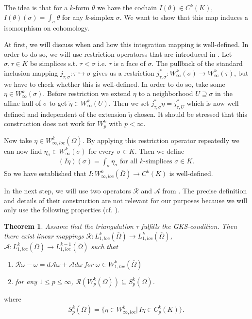 \documentclass[12pt,a4paper]{article}
\newtheorem{theorem}{Theorem}
\theoremstyle{definition}
\newcommand{\aop}{\mathscr{A}}
\newcommand{\omegabar}{\overline{\Omega}}
\newcommand{\rop}{\mathscr{R}} %
\begin{document}
The idea is that for a $k$-form $\theta$ we have the cochain 
$I(\theta) \in C^k(K)$, $I(\theta)(\sigma) = \int_\sigma \theta$ for any
$k$-simplex $\sigma$. We want to show that this map induces a isomorphism on
cohomology. 


At first, we will discuss when and how this integration mapping is well-defined. 
In order to do so, we will use restriction operatorss that are introduced in
\cite[p.191]{goldshtein}. Let $\sigma, \tau \in K$ be simplices s.t.
$\tau < \sigma$ i.e. $\tau$ is a face of $\sigma$. The pullback of the standard
inclusion mapping $j_{\tau, \sigma}: \tau \hookrightarrow \sigma$ gives us 
a restriction 
$j^*_{\tau, \sigma}: W^k_\infty(\sigma) \rightarrow W^k_\infty(\tau)$, but 
we have to check whether this is well-defined. In order to do so, take 
some $\eta \in W^k_\infty(\sigma)$. Before restriction we extend $\eta$ to 
a neighborhood $U \supseteq \sigma$ in the affine hull of $\sigma$ to 
get $\tilde{\eta} \in W^k_\infty(U)$. Then we set 
$j^*_{\tau, \sigma} \eta = j^*_{\tau, U}$ which is now well-defined and 
independent of the extension $\tilde{\eta}$ chosen. It should be stressed 
that this construction does not work for $W^k_p$ with $p < \infty$. 


Now take $\eta \in W^k_{\infty,loc}(\omegabar)$. By applying this restriction
operator repeatedly we can now find $\eta_\sigma \in W^k_\infty(\sigma)$ for 
every $\sigma \in K$. Then we define 
\begin{align*}
    (I\eta) (\sigma) = \int_\sigma \eta_\sigma 
    \text{ for all $k$-simplices } \sigma \in K .
\end{align*}
So we have established that $I: W^k_{\infty,loc}(\omegabar) \rightarrow C^k(K)$ 
is well-defined.


In the next step, we will use two operators $\rop$ and $\aop$ from 
\cite{goldshtein}.
The precise definition and details of their construction
are not relevant for our purposes because we will only use
the following properties (cf. \cite[Thm.2]{goldshtein}).

\begin{theorem}\label{operators}
    Assume that the triangulation $\tau$ fulfills the GKS-condition.
    Then there exist linear mappings 
    $\mathscr{R}: L^k_{1,loc}(\omegabar) \rightarrow 
    L^k_{1,loc}(\omegabar)$, $\mathscr{A}: L^k_{1,loc}(\omegabar) 
    \rightarrow L^{k-1}_{1,loc}(\omegabar)$ 
    such that
    \begin{enumerate}
        \item $\mathscr{R}\omega - \omega = 
            d\mathscr{A}\omega + \mathscr{A}d\omega$ for 
            $\omega \in W^k_{1,loc}(\omegabar)$
        \item for any $1 \leq p \leq \infty$, 
            $\rop(W^k_p(\omegabar)) \subseteq S^k_p(\omegabar)$.
    \end{enumerate}
\end{theorem}
where
\begin{align*}
    S^k_p(\omegabar) = \{ \eta \in W^k_{\infty,loc} | \, 
    I\eta \in C^k_p(K)\}.
\end{align*}
\end{document}
